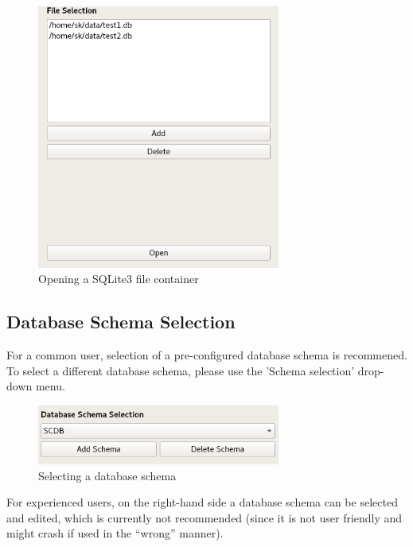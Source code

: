 \documentclass[10pt,letterpaper,extrafontsizes]{memoir}
\begin{document}
\begin{figure}[H]
  \center
    \includegraphics[width=8cm,frame]{../screenshots/sqlite3_open.png}
  \caption{Opening a SQLite3 file container}
  \label{fig:sqlite3_open}
\end{figure}

\subsection{Database Schema Selection}
For a common user, selection of a pre-configured database schema is recommened. To select a different database schema, please use the 'Schema selection' drop-down menu.\\

\begin{figure}[H]
  \center
    \includegraphics[width=8cm,frame]{../screenshots/database_schema_selection.png}
  \caption{Selecting a database schema}
  \label{fig:db_schema_select}
\end{figure}

For experienced users, on the right-hand side a database schema can be selected and edited, which is currently not recommended (since it is not user friendly and might crash if used in the ``wrong'' manner).
\end{document}
